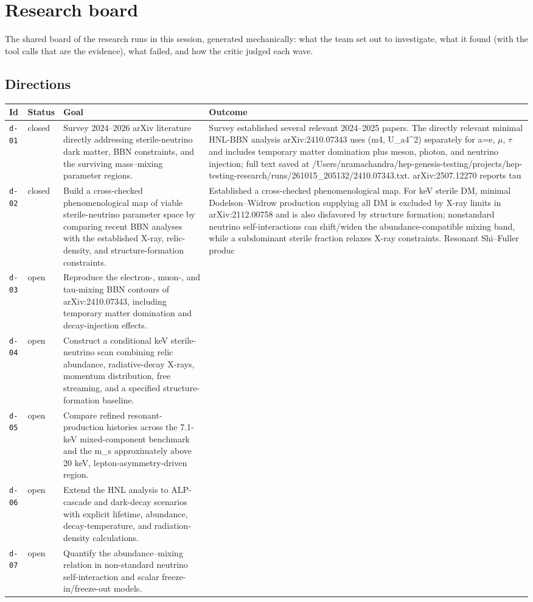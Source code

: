 \documentclass[11pt,a4paper]{article}
\begin{document}
\section{Research board}
\label{app:board}
The shared board of the research runs in this session, generated mechanically: what the team set out to investigate, what it found (with the tool calls that are the evidence), what failed, and how the critic judged each wave.
\subsection{Directions}
\begin{longtable}{@{}p{}p{}p{}p{}@{}}
\toprule Id & Status & Goal & Outcome \\ \midrule \endhead
\texttt{d-01} & closed & Survey 2024--2026 arXiv literature directly addressing sterile-neutrino dark matter, BBN constraints, and the surviving mass--mixing parameter regions. & Survey established several relevant 2024--2025 papers. The directly relevant minimal HNL-BBN analysis arXiv:2410.07343 uses (m4, \textbar{}U\_a4\textbar{}\textasciicircum{}2) separately for a=e, $\mu$, $\tau$ and includes temporary matter domination plus meson, photon, and neutrino injection; full text saved at /Users/nramachandra/hep-genesis-testing/projects/hep-testing-research/runs/261015\_205132/2410.07343.txt. arXiv:2507.12270 reports tau \\
\texttt{d-02} & closed & Build a cross-checked phenomenological map of viable sterile-neutrino parameter space by comparing recent BBN analyses with the established X-ray, relic-density, and structure-formation constraints. & Established a cross-checked phenomenological map. For keV sterile DM, minimal Dodelson--Widrow production supplying all DM is excluded by X-ray limits in arXiv:2112.00758 and is also disfavored by structure formation; nonstandard neutrino self-interactions can shift/widen the abundance-compatible mixing band, while a subdominant sterile fraction relaxes X-ray constraints. Resonant Shi--Fuller produc \\
\texttt{d-03} & open & Reproduce the electron-, muon-, and tau-mixing BBN contours of arXiv:2410.07343, including temporary matter domination and decay-injection effects. &  \\
\texttt{d-04} & open & Construct a conditional keV sterile-neutrino scan combining relic abundance, radiative-decay X-rays, momentum distribution, free streaming, and a specified structure-formation baseline. &  \\
\texttt{d-05} & open & Compare refined resonant-production histories across the 7.1-keV mixed-component benchmark and the m\_s approximately above 20 keV, lepton-asymmetry-driven region. &  \\
\texttt{d-06} & open & Extend the HNL analysis to ALP-cascade and dark-decay scenarios with explicit lifetime, abundance, decay-temperature, and radiation-density calculations. &  \\
\texttt{d-07} & open & Quantify the abundance--mixing relation in non-standard neutrino self-interaction and scalar freeze-in/freeze-out models. &  \\
\bottomrule\end{longtable}
\end{document}
